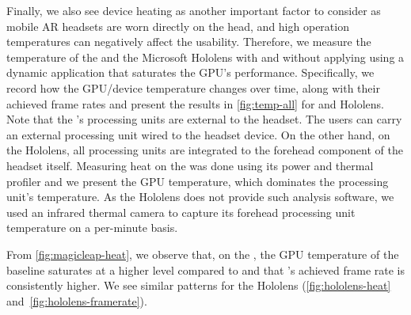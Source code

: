 Finally, we also see device heating as another important factor to consider as mobile AR headsets are worn directly on the head, and high operation temperatures can negatively affect the usability. Therefore, we measure the temperature of the {\mlo} and the Microsoft Hololens with and without applying {\myit} using a dynamic application that saturates the GPU's performance. Specifically, we record how the GPU/device temperature changes over time, along with their achieved frame rates and present the results in \fig\ref{fig:temp-all} for {\mlo} and Hololens. Note that the {\mlo}'s processing units are external to the headset. The users can carry an external processing unit wired to the headset device. On the other hand, on the Hololens, all processing units are integrated to the forehead component of the headset itself. Measuring heat on the {\mlo} was done using its power and thermal profiler and we present the GPU temperature, which dominates the processing unit's temperature. As the Hololens does not provide such analysis software, we used an infrared thermal camera to capture its forehead processing unit temperature on a per-minute basis.


From \fig\ref{fig:magicleap-heat}, we observe that, on the {\mlo}, the GPU temperature of the baseline saturates at a higher level compared to {\myit} and that {\myit}'s achieved frame rate is consistently higher. We see similar patterns for the Hololens (\figs\ref{fig:hololens-heat} and~\ref{fig:hololens-framerate}). 





%
%
%

